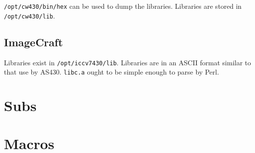 \documentclass[]{book}
\begin{document}

{\tt /opt/cw430/bin/hex} can be used to dump the libraries.
Libraries are stored in {\tt /opt/cw430/lib}.

\section{ImageCraft}


Libraries exist in {\tt /opt/iccv7430/lib}.  Libraries are in an ASCII format
similar to that use by AS430.  {\tt libc.a} ought to be simple enough to parse
by Perl.

\appendix

\chapter{Subs}
%

\chapter{Macros}
%

\printindex
\end{document}
